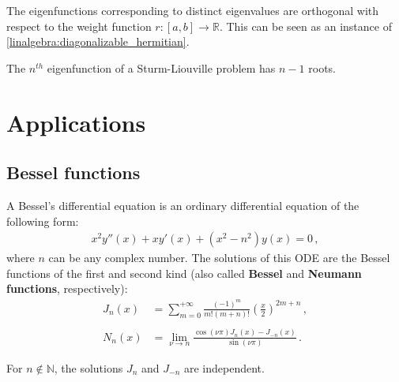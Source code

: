     \begin{property}
        The eigenfunctions corresponding to distinct eigenvalues are orthogonal with respect to the weight function $r:[a,b]\rightarrow\mathbb{R}$. This can be seen as an instance of \cref{linalgebra:diagonalizable_hermitian}.
    \end{property}

    \begin{theorem}
        The $n^{th}$ eigenfunction of a Sturm-Liouville problem has $n-1$ roots.
    \end{theorem}

\section{Applications}
\subsection{Bessel functions}

    A Bessel's differential equation is an ordinary differential equation of the following form:
    \begin{gather}
        \label{ode:differential_equation}
        x^2y''(x) + xy'(x) + (x^2 - n^2)y(x) = 0\,,
    \end{gather}
    where $n$ can be any complex number. The solutions of this ODE are the Bessel functions of the first and second kind (also called \textbf{Bessel} and \textbf{Neumann functions}, respectively):
    \begin{align}
        \label{ode:bessel_function}
        J_n(x) &= \sum_{m=0}^{+\infty}\frac{(-1)^m}{m!(m+n)!}\left(\frac{x}{2}\right)^{2m+n}\,,\\\nonumber\\
        \label{ode:neumann_function}
        N_n(x) &= \lim_{\nu\rightarrow n}\frac{\cos(\nu\pi)J_n(x) - J_{-n}(x)}{\sin(\nu\pi)}\,.
    \end{align}

    \begin{property}
        For $n\not\in\mathbb{N}$, the solutions $J_n$ and $J_{-n}$ are independent.
    \end{property}

